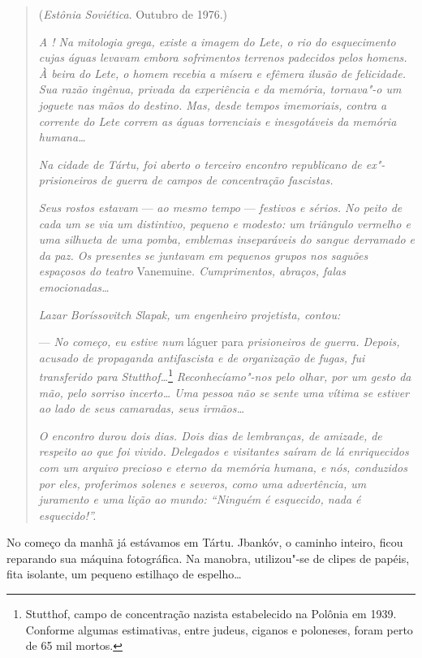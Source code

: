 \begin{quotation}
\begin{flushright}
(\emph{Estônia Soviética}. Outubro de 1976.)
\end{flushright}
\vspace{4pt}
\noindent\emph{A ! Na mitologia grega, existe a imagem
do Lete, o rio do esquecimento cujas águas levavam embora sofrimentos
terrenos padecidos pelos homens. À beira do Lete, o homem recebia a
mísera e efêmera ilusão de felicidade. Sua razão ingênua, privada da
experiência e da memória, tornava"-o um joguete nas mãos do destino. Mas,
desde tempos imemoriais, contra a corrente do Lete correm as águas
torrenciais e inesgotáveis da memória humana\ldots{}}

\emph{Na cidade de Tártu, foi aberto o terceiro encontro republicano de
ex"-prisioneiros de guerra de campos de concentração fascistas.}

\emph{Seus rostos estavam} --- \emph{ao mesmo tempo} --- \emph{festivos
e sérios. No peito de cada um se via um distintivo, pequeno e modesto:
um triângulo vermelho e uma silhueta de uma pomba, emblemas inseparáveis
do sangue derramado e da paz. Os presentes se juntavam em pequenos
grupos nos saguões espaçosos do teatro} Vanemuine\emph{. Cumprimentos,
abraços, falas emocionadas\ldots{}}

\emph{Lazar Boríssovitch Slapak, um engenheiro projetista, contou:}

--- \emph{No começo, eu estive num} láguer para \emph{prisioneiros de
guerra. Depois, acusado de propaganda antifascista e de organização de
fugas, fui transferido para Stutthof\ldots{}}\footnote{Stutthof, campo
  de concentração nazista estabelecido na Polônia em 1939. Conforme
  algumas estimativas, entre judeus, ciganos e poloneses, foram perto de
  65 mil mortos.} \emph{Reconhecíamo"-nos pelo olhar, por um gesto da
mão, pelo sorriso incerto\ldots{} Uma pessoa não se sente uma vítima se
estiver ao lado de seus camaradas, seus irmãos\ldots{}}

\emph{O encontro durou dois dias. Dois dias de lembranças, de amizade,
de respeito ao que foi vivido. Delegados e visitantes saíram de lá
enriquecidos com um arquivo precioso e eterno da memória humana, e nós,
conduzidos por eles, proferimos solenes e severos, como uma advertência,
um juramento e uma lição ao mundo: ``Ninguém é esquecido, nada é
esquecido!''.}
\end{quotation}

No começo da manhã já estávamos em Tártu. Jbankóv, o caminho inteiro,
ficou reparando sua máquina fotográfica. Na manobra, utilizou"-se de
clipes de papéis, fita isolante, um pequeno estilhaço de espelho\ldots{}

